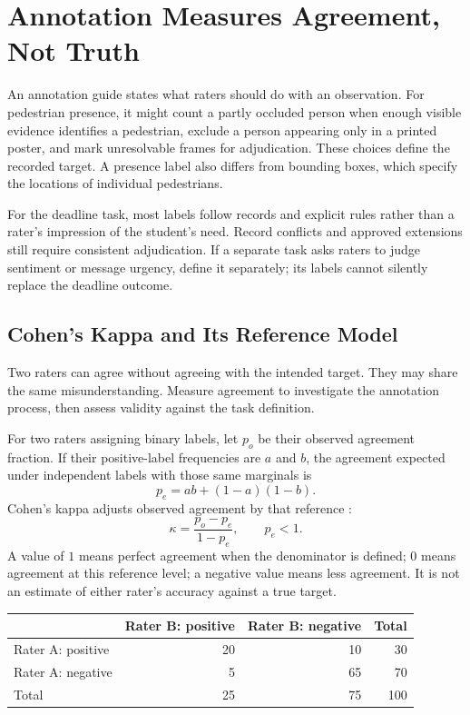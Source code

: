 \section{Annotation Measures Agreement, Not Truth}

An annotation guide states what raters should do with an observation. For pedestrian presence, it might count a partly occluded person when enough visible evidence identifies a pedestrian, exclude a person appearing only in a printed poster, and mark unresolvable frames for adjudication. These choices define the recorded target. A presence label also differs from bounding boxes, which specify the locations of individual pedestrians.

For the deadline task, most labels follow records and explicit rules rather than a rater's impression of the student's need. Record conflicts and approved extensions still require consistent adjudication. If a separate task asks raters to judge sentiment or message urgency, define it separately; its labels cannot silently replace the deadline outcome.

\subsection{Cohen's Kappa and Its Reference Model}

Two raters can agree without agreeing with the intended target. They may share the same misunderstanding. Measure agreement to investigate the annotation process, then assess validity against the task definition.

For two raters assigning binary labels, let $p_o$ be their observed agreement fraction. If their positive-label frequencies are $a$ and $b$, the agreement expected under independent labels with those same marginals is
\[
p_e=ab+(1-a)(1-b).
\]
Cohen's kappa adjusts observed agreement by that reference \citep{cohen1960}:
\[
\kappa=\frac{p_o-p_e}{1-p_e},\qquad p_e<1.
\]
A value of $1$ means perfect agreement when the denominator is defined; $0$ means agreement at this reference level; a negative value means less agreement. It is not an estimate of either rater's accuracy against a true target.

\par\addvspace{\intextsep}\noindent\begin{minipage}{\linewidth}
\centering\small
\begin{tabular}{@{}lrrr@{}}
\toprule
 & Rater B: positive & Rater B: negative & Total \\
\midrule
Rater A: positive & 20 & 10 & 30 \\
Rater A: negative & 5 & 65 & 70 \\
\midrule
Total & 25 & 75 & 100 \\
\bottomrule
\end{tabular}
\label{tab:annotation-agreement}
\end{minipage}\par\addvspace{\intextsep}


